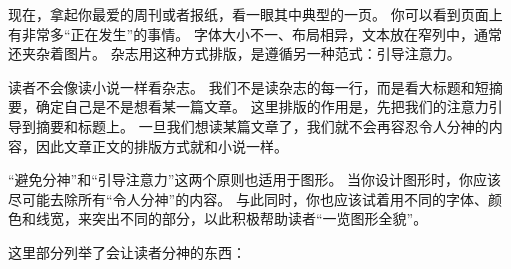 现在，拿起你最爱的周刊或者报纸，看一眼其中典型的一页。
你可以看到页面上有非常多“正在发生”的事情。
字体大小不一、布局相异，文本放在窄列中，通常还夹杂着图片。
杂志用这种方式排版，是遵循另一种范式：引导注意力。

读者不会像读小说一样看杂志。
我们不是读杂志的每一行，而是看大标题和短摘要，确定自己是不是想看某一篇文章。
这里排版的作用是，先把我们的注意力引导到摘要和标题上。
一旦我们想读某篇文章了，我们就不会再容忍令人分神的内容，因此文章正文的排版方式就和小说一样。

“避免分神”和“引导注意力”这两个原则也适用于图形。
当你设计图形时，你应该尽可能去除所有“令人分神”的内容。
与此同时，你也应该试着用不同的字体、颜色和线宽，来突出不同的部分，以此积极帮助读者“一览图形全貌”。

这里部分列举了会让读者分神的东西：

\eohs

